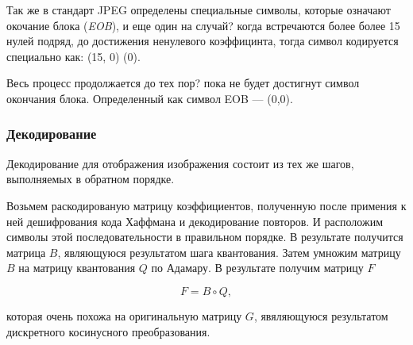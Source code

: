 \documentclass{matmex-diploma-custom}
\begin{document}
Так же в стандарт JPEG определены специальные символы, которые означают окочание блока (\emph{EOB}), и еще один на случай? когда встречаются более более 15 нулей подряд, до достижения ненулевого коэффицинта, тогда символ кодируется специально как: (15, 0) (0).

 Весь процесс продолжается до тех пор? пока не будет достигнут символ окончания блока. Определенный как символ  EOB --- (0,0).\\



\subsubsection{Декодирование}

Декодирование для отображения изображения состоит из тех же шагов, выполняемых в обратном порядке.


Возьмем раскодированую матрицу коэффициентов, полученную после примения к ней дешифрования кода Хаффмана и декодирование повторов. И расположим символы этой последовательности в правильном порядке. В результате получится матрица $B$, являющуюся результатом шага квантования.
Затем умножим матрицу $B$ на матрицу квантования $Q$ по Адамару. В результате получим матрицу $F$

$$ F = B \circ Q,$$

которая очень похожа на оригинальную  матрицу $G$, явяляющуюся результатом дискретного косинусного преобразования.

\end{document}
